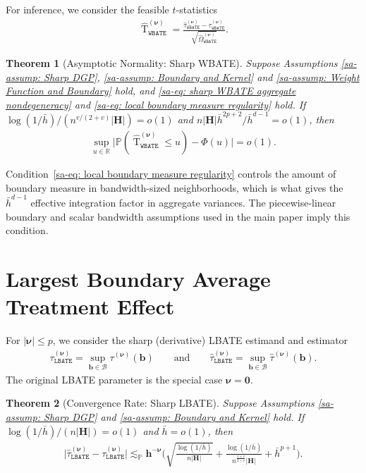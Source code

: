 \documentclass[10pt]{article}
\newtheorem{thm}{Theorem}
\DeclareMathOperator{\Tstat}{T}
\renewcommand{\P}{\mathbb{P}}
\newcommand{\reals}{\mathbb{R}}
\newcommand{\lessp}{\lesssim_{\mathbb{P}}}
\newcommand{\bb}{\mathbf{b}}
\newcommand{\bh}{\mathbf{h}}
\newcommand{\bH}{\mathbf{H}}
\newcommand{\bnu}{\boldsymbol{\nu}}
\newcommand{\B}{\mathcal{B}}
\begin{document}
For inference, we consider the feasible $t$-statistics
\begin{align*}
    \widehat{\Tstat}_{\mathtt{WBATE}}^{(\bnu)} = \frac{\widehat{\tau}_{\mathtt{WBATE}}^{(\bnu)} - \tau_{\mathtt{WBATE}}^{(\bnu)}}{\sqrt{\widehat{\Omega}_{\mathtt{WBATE}}^{(\bnu)}}}.
\end{align*}

\begin{thm}[Asymptotic Normality: Sharp WBATE]\label{sa-thm: Asymptotic Normality: Sharp WBATE}
    Suppose Assumptions \ref{sa-assump: Sharp DGP}, \ref{sa-assump: Boundary and Kernel} and \ref{sa-assump: Weight Function and Boundary} hold, and \eqref{sa-eq: sharp WBATE aggregate nondegeneracy} and \eqref{sa-eq: local boundary measure regularity} hold. If $\log(1/\bar{h})/(n^{v/(2+v)}|\bH|) = o(1)$ and $n|\bH|\bar{h}^{2p+2}/\bar{h}^{d-1} = o(1)$, then
    \begin{align*}
        \sup_{u \in \reals} \big|\P (\widehat{\Tstat}_{\mathtt{WBATE}}^{(\bnu)} \leq u )  - \Phi(u) \big| = o(1).
    \end{align*}
\end{thm}

Condition~\eqref{sa-eq: local boundary measure regularity} controls the amount of boundary measure in bandwidth-sized neighborhoods, which is what gives the $\bar h^{d-1}$ effective integration factor in aggregate variances. The piecewise-linear boundary and scalar bandwidth assumptions used in the main paper imply this condition.

\section{Largest Boundary Average Treatment Effect}

For $|\bnu|\leq p$, we consider the sharp (derivative) LBATE estimand and estimator
\begin{align*}
    \tau_{\mathtt{LBATE}}^{(\bnu)} = \sup_{\bb \in \B} \tau^{(\bnu)}(\bb)
    \qquad\text{and}\qquad
    \widehat{\tau}_{\mathtt{LBATE}}^{(\bnu)} = \sup_{\bb \in \B} \widehat{\tau}^{(\bnu)}(\bb).
\end{align*}
The original LBATE parameter is the special case $\bnu=\mathbf{0}$.

\begin{thm}[Convergence Rate: Sharp LBATE]\label{sa-thm: Convergence Rate: Sharp LBATE}
    Suppose Assumptions \ref{sa-assump: Sharp DGP} and \ref{sa-assump: Boundary and Kernel} hold. If $\log(1/\bar{h})/(n |\bH|) = o(1)$ and $\bar{h} = o(1)$, then
    \begin{align*}
        \big|\widehat{\tau}_{\mathtt{LBATE}}^{(\bnu)} - \tau_{\mathtt{LBATE}}^{(\bnu)} \big|
        \lessp \bh^{-\bnu}\Big(\sqrt{\frac{\log(1/\bar{h})}{ n |\bH|}} + \frac{\log(1/\bar{h})}{n^{\frac{1+v}{2+v}}|\bH|} + \bar{h}^{p+1}\Big).
    \end{align*}
\end{thm}
\end{document}
